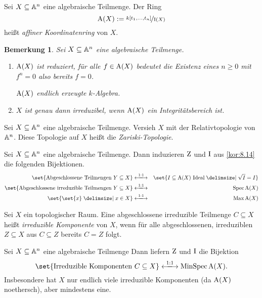 \documentclass[12pt,a4paper]{scrartcl}
\theoremstyle{cplain}
\theoremstyle{cdef}
\newtheorem{beme}[thmcounter]{Bemerkung}
\begin{document}
\begin{defi}
	Sei $X\subseteq \mathbb A^n$ eine algebraische Teilmenge. Der Ring
	\[\operatorname{A}(X) := \nicefrac{k[t_1,\dots, t_n]}{\operatorname{I}(X)}\]
	heißt \emph{affiner Koordinatenring} von $X$.
	
\end{defi}
\begin{beme}
	Sei $X\subseteq \mathbb A^n$ eine algebraische Teilmenge.
	\begin{enumerate}
		\item $\operatorname{A}(X)$ ist \emph{reduziert}, für alle $f\in \operatorname{A}(X)$ bedeutet die Existenz eines $n\ge 0$ mit $f^n = 0$ also bereits $f = 0$.
		
		$\operatorname{A}(X)$ endlich erzeugte $k$-Algebra.
		\item $X$ ist genau dann irreduzibel, wenn $\operatorname{A}(X)$ ein Integritätsbereich ist.
	\end{enumerate}
\end{beme}
\begin{defi}
	Sei $X\subseteq \mathbb A^n$ eine algebraische Teilmenge. Versieh $X$ mit der Relativtopologie von $\mathbb A^n$. Diese Topologie auf $X$ heißt die \emph{Zariski-Topologie}.
\end{defi}
\begin{kor}
	Sei $X\subseteq\mathbb A^n$ eine algebraische Teilmenge. Dann induzieren $\operatorname{Z}$ und $\operatorname{I}$ aus \cref{kor:8.14} die folgenden Bijektionen.
	\begin{eqnarray*}
		\set{\text{Abgeschlossene Teilmengen }Y\subseteq X} &\xlongleftrightarrow{1:1}&\set{I\subseteq \A(X) \text{ Ideal}\given \sqrt{I} = I}\\
		\set{\text{Abgeschlossene irreduzible Teilmengen }Y\subseteq X}&\xlongleftrightarrow{1:1}&\Spec \A(X)\\
		\set{\set{x}\given x\in X}&\xlongleftrightarrow{1:1}&\Max \A(X)
	\end{eqnarray*}
\end{kor}
\begin{defi}
	Sei $X$ ein topologischer Raum. Eine abgeschlossene irreduzible Teilmenge $C\subseteq X$ heißt \emph{irreduzible Komponente} von $X$, wenn für alle abgeschlossenen, irreduziblen $Z\subseteq X$ aus $C\subseteq Z$ bereits $C = Z$ folgt.
\end{defi}
\begin{kor}
	Sei $X\subseteq \mathbb A^n$ eine algebraische Teilmenge Dann liefern $\operatorname{Z}$ und $\operatorname{I}$ die Bijektion
	\[\set{\text{Irreduzible Komponenten }C\subseteq X}\xlongleftrightarrow{1:1} \MinSpec\A(X).\]
	Insbesondere hat $X$ nur endlich viele irreduzible Komponenten (da $\operatorname{A}(X)$ noethersch), aber mindestens eine.
\end{kor}
\end{document}

